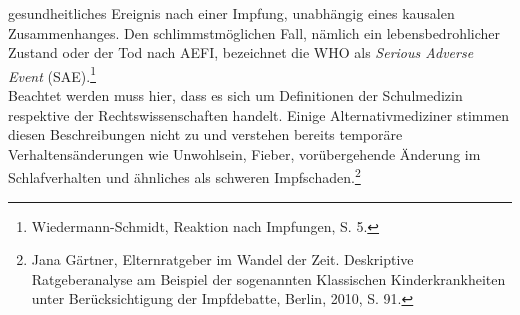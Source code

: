\documentclass[
    a4paper,
    12pt,
    hyphens,
    chapterprefix=true,
    headheight=33pt,
    footheight=29pt,
    headings=optiontohead, %
]{scrartcl}
\begin{document}
gesundheitliches Ereignis nach einer Impfung, unabhängig eines kausalen Zusammenhanges. Den schlimmstmöglichen Fall, nämlich ein lebensbedrohlicher
Zustand oder der Tod nach AEFI, bezeichnet die WHO als \textit{Serious Adverse Event} (SAE).\footnote{Wiedermann-Schmidt, Reaktion nach Impfungen, S. 5.}\\
Beachtet werden muss hier, dass es sich um Definitionen der Schulmedizin respektive der Rechtswissenschaften handelt. Einige Alternativmediziner
stimmen diesen Beschreibungen nicht zu und verstehen bereits temporäre Verhaltensänderungen wie Unwohlsein, Fieber, vorübergehende Änderung im Schlafverhalten und ähnliches als schweren Impfschaden.\footnote{Jana Gärtner, Elternratgeber im Wandel der Zeit.
Deskriptive Ratgeberanalyse am Beispiel der sogenannten Klassischen Kinderkrankheiten unter Berücksichtigung der Impfdebatte, Berlin, 2010, S. 91.}
\end{document}
